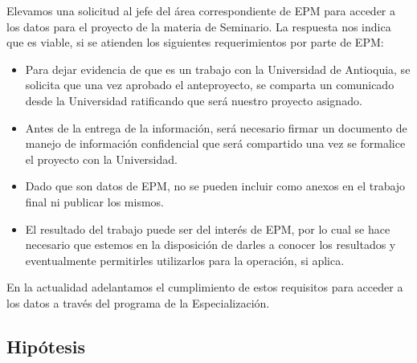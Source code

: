 \documentclass[a4paper]{article}
\begin{document}
Elevamos una solicitud al jefe del área correspondiente de EPM para acceder a los datos para el proyecto de la materia de Seminario. La respuesta nos indica que es viable, si se atienden los siguientes requerimientos por parte de EPM:

\begin{itemize}
    \item Para dejar evidencia de que es un trabajo con la Universidad de Antioquia, se solicita que una vez aprobado el anteproyecto, se comparta un comunicado desde la Universidad ratificando que será nuestro proyecto asignado.
    \item Antes de la entrega de la información, será necesario firmar un documento de manejo de información confidencial que será compartido una vez se formalice el proyecto con la Universidad.
    \item Dado que son datos de EPM, no se pueden incluir como anexos en el trabajo final ni publicar los mismos.
    \item El resultado del trabajo puede ser del interés de EPM, por lo cual se hace necesario que estemos en la disposición de darles a conocer los resultados y eventualmente permitirles utilizarlos para la operación, si aplica.
\end{itemize}

En la actualidad adelantamos el cumplimiento de estos requisitos para acceder a los datos a través del programa de la Especialización.

\subsection{Hipótesis}
\end{document}
